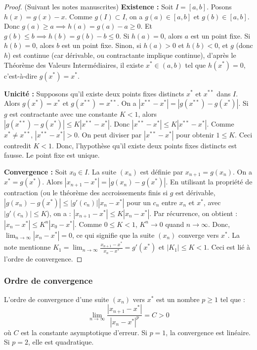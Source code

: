 \begin{proof}
(Suivant les notes manuscrites)
\textbf{Existence :} Soit $I = [a,b]$. Posons $h(x) = g(x) - x$.
Comme $g(I) \subset I$, on a $g(a) \in [a,b]$ et $g(b) \in [a,b]$.
Donc $g(a) \ge a \implies h(a) = g(a) - a \ge 0$.
Et $g(b) \le b \implies h(b) = g(b) - b \le 0$.
Si $h(a)=0$, alors $a$ est un point fixe. Si $h(b)=0$, alors $b$ est un point fixe.
Sinon, si $h(a)>0$ et $h(b)<0$, et $g$ (donc $h$) est continue (car dérivable, ou contractante implique continue), d'après le Théorème des Valeurs Intermédiaires, il existe $x^* \in (a,b)$ tel que $h(x^*) = 0$, c'est-à-dire $g(x^*) = x^*$.

\textbf{Unicité :} Supposons qu'il existe deux points fixes distincts $x^*$ et $x^{**}$ dans $I$.
Alors $g(x^*) = x^*$ et $g(x^{**}) = x^{**}$.
On a $|x^{**} - x^*| = |g(x^{**}) - g(x^*)|$.
Si $g$ est contractante avec une constante $K < 1$, alors $|g(x^{**}) - g(x^*)| \le K |x^{**} - x^*|$.
Donc $|x^{**} - x^*| \le K |x^{**} - x^*|$.
Comme $x^* \neq x^{**}$, $|x^{**} - x^*| > 0$. On peut diviser par $|x^{**} - x^*|$ pour obtenir $1 \le K$.
Ceci contredit $K < 1$. Donc, l'hypothèse qu'il existe deux points fixes distincts est fausse. Le point fixe est unique.

\textbf{Convergence :} Soit $x_0 \in I$. La suite $(x_n)$ est définie par $x_{n+1} = g(x_n)$.
On a $x^* = g(x^*)$.
Alors $|x_{n+1} - x^*| = |g(x_n) - g(x^*)|$.
En utilisant la propriété de contraction (ou le théorème des accroissements finis si $g$ est dérivable, $|g(x_n) - g(x^*)| \le |g'(c_n)| |x_n - x^*|$ pour un $c_n$ entre $x_n$ et $x^*$, avec $|g'(c_n)| \le K$), on a :
$|x_{n+1} - x^*| \le K |x_n - x^*|$.
Par récurrence, on obtient :
$|x_n - x^*| \le K^n |x_0 - x^*|$.
Comme $0 \le K < 1$, $K^n \to 0$ quand $n \to \infty$.
Donc, $\lim_{n \to \infty} |x_n - x^*| = 0$, ce qui signifie que la suite $(x_n)$ converge vers $x^*$.
La note mentionne $K_1 = \lim_{n\to\infty} \frac{x_{n+1}-x^*}{x_n-x^*} = g'(x^*)$ et $|K_1| \le K < 1$. Ceci est lié à l'ordre de convergence.
\end{proof}

\subsubsection{Ordre de convergence}
L'ordre de convergence d'une suite $(x_n)$ vers $x^*$ est un nombre $p \ge 1$ tel que :
$$ \lim_{n \to \infty} \frac{|x_{n+1} - x^*|}{|x_n - x^*|^p} = C > 0 $$
où $C$ est la constante asymptotique d'erreur.
Si $p=1$, la convergence est linéaire. Si $p=2$, elle est quadratique.

